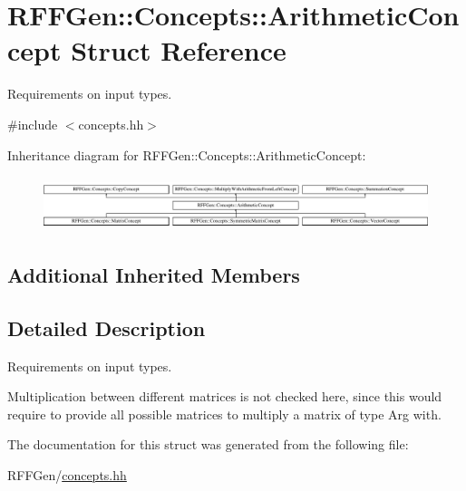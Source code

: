 \hypertarget{structRFFGen_1_1Concepts_1_1ArithmeticConcept}{\section{R\-F\-F\-Gen\-:\-:Concepts\-:\-:Arithmetic\-Concept Struct Reference}
\label{structRFFGen_1_1Concepts_1_1ArithmeticConcept}
}


Requirements on input types.  




{\ttfamily \#include $<$concepts.\-hh$>$}

Inheritance diagram for R\-F\-F\-Gen\-:\-:Concepts\-:\-:Arithmetic\-Concept\-:\begin{figure}[H]
\begin{center}
\leavevmode
\includegraphics[height=1.586402cm]{structRFFGen_1_1Concepts_1_1ArithmeticConcept}
\end{center}
\end{figure}
\subsection*{Additional Inherited Members}


\subsection{Detailed Description}
Requirements on input types. 

Multiplication between different matrices is not checked here, since this would require to provide all possible matrices to multiply a matrix of type Arg with. 

The documentation for this struct was generated from the following file\-:\begin{DoxyCompactItemize}
\item 
R\-F\-F\-Gen/\hyperlink{concepts_8hh}{concepts.\-hh}\end{DoxyCompactItemize}
